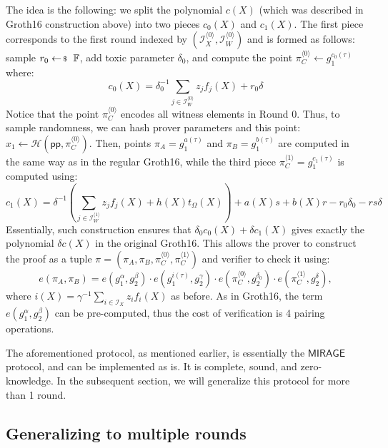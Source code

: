 The idea is the following: we split the polynomial $c(X)$ (which was described
in Groth16 construction above) into two pieces $c_0(X)$ and $c_1(X)$. The first
piece corresponds to the first round indexed by $(\mathcal{I}_X^{\langle 0
\rangle}, \mathcal{I}_W^{\langle 0 \rangle})$ and is formed as follows: sample
$r_0 \leftarrowS \mathbb{F}$, add toxic parameter $\delta_0$, and compute the point
$\pi_C^{\langle 0 \rangle} \gets g_1^{c_0(\tau)}$ where:
\[
c_0(X) = \delta_0^{-1}\sum_{j \in \mathcal{I}_W^{\langle 0 \rangle}} z_jf_j(X) + r_0\delta
\]
Notice that the point $\pi_C^{\langle 0 \rangle}$ encodes all witness elements
in Round 0. Thus, to sample randomness, we can hash prover parameters and this
point: $x_1 \gets \mathcal{H}(\mathsf{pp}, \pi_C^{\langle 0 \rangle})$. Then,
points $\pi_A=g_1^{a(\tau)}$ and $\pi_B=g_1^{b(\tau)}$ are computed in the same
way as in the regular Groth16, while the third piece $\pi_C^{\langle 1 \rangle}
= g_1^{c_1(\tau)}$ is computed using:
\[
c_1(X) = \delta^{-1}\left(\sum_{j \in \mathcal{I}_W^{\langle 1 \rangle}} z_jf_j(X)+h(X)t_{\Omega}(X)\right) + a(X)s + b(X)r - r_0\delta_0 - rs\delta
\]
Essentially, such construction ensures that $\delta_0c_0(X)+\delta c_1(X)$ gives
exactly the polynomial $\delta c(X)$ in the original Groth16. This allows the
prover to construct the proof as a tuple $\pi=(\pi_A,\pi_B,\pi_C^{\langle 0
\rangle},\pi_C^{\langle 1 \rangle})$ and verifier to check it using:
\[
e(\pi_A,\pi_B) = e(g_1^{\alpha},g_2^{\beta}) \cdot e(g_1^{i(\tau)},g_2^{\gamma}) \cdot e(\pi_C^{\langle 0 \rangle}, g_2^{\delta_0}) \cdot e(\pi_C^{\langle 1 \rangle}, g_2^{\delta}),
\]
where $i(X) = \gamma^{-1}\sum_{i \in \mathcal{I}_X}z_if_i(X)$ as before. As in
Groth16, the term $e(g_1^{\alpha}, g_2^{\beta})$ can be pre-computed, thus the
cost of verification is 4 pairing operations.

\begin{remark}
The aforementioned protocol, as mentioned earlier, is essentially the $\textsf{MIRAGE}$ protocol, and can be implemented as is. It is complete, sound, and zero-knowledge. In the subsequent section, we will generalize this protocol for more than 1 round.
\end{remark}

\subsection{Generalizing to multiple rounds}

